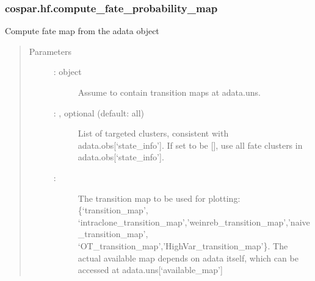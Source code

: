 \documentclass[letterpaper,10pt,english]{sphinxmanual}
\begin{document}
\subsubsection{cospar.hf.compute\_fate\_probability\_map}
\label{\detokenize{cospar.hf.compute_fate_probability_map:cospar-hf-compute-fate-probability-map}}\label{\detokenize{cospar.hf.compute_fate_probability_map::doc}}

\begin{fulllineitems}
\label{\detokenize{cospar.hf.compute_fate_probability_map:cospar.hf.compute_fate_probability_map}}
Compute fate map from the adata object
\begin{quote}\begin{description}
\item[{Parameters}] \leavevmode\begin{description}
\item[{ :  object}] \leavevmode
Assume to contain transition maps at adata.uns.

\item[{ : , optional (default: all)}] \leavevmode
List of targeted clusters, consistent with adata.obs{[}‘state\_info’{]}.
If set to be {[}{]}, use all fate clusters in adata.obs{[}‘state\_info’{]}.

\item[{ : }] \leavevmode
The transition map to be used for plotting: \{‘transition\_map’,
‘intraclone\_transition\_map’,’weinreb\_transition\_map’,’naive\_transition\_map’,
‘OT\_transition\_map’,’HighVar\_transition\_map’\}. The actual available
map depends on adata itself, which can be accessed at adata.uns{[}‘available\_map’{]}


\end{description}
\end{description}
\end{quote}
\end{fulllineitems}
\end{document}
